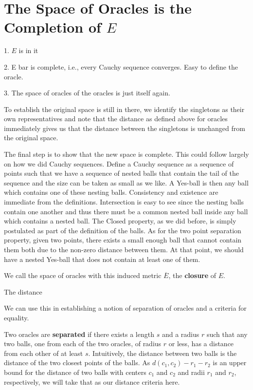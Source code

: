 \documentclass[12pt]{article}
\begin{document}
\section{The Space of Oracles is the Completion of \texorpdfstring{$E$}{E}}

1. $E$ is in it

2. E bar is complete, i.e., every Cauchy sequence converges. Easy to define the oracle.

3. The space of oracles of the oracles is just itself again. 

To establish the original space is still in there, we identify the singletons as their own representatives and note that the distance as defined above for oracles immediately gives us that the distance between the singletons is unchanged from the original space. 

The final step is to show that the new space is complete. This could follow largely on how we did Cauchy sequences. Define a Cauchy sequence as a sequence of points such that we have a sequence of nested balls that contain the tail of the sequence and the size can be taken as small as we like. A Yes-ball is then any ball which contains one of these nesting balls. Consistency and existence are immediate from the definitions. Intersection is easy to see since the nesting balls contain one another and thus there must be a common nested ball inside any ball which contains a nested ball. The Closed property, as we did before, is simply postulated as part of the definition of the balls. As for the two point separation property, given two points, there exists a small enough ball that cannot contain them both due to the non-zero distance between them. At that point, we should have a nested Yes-ball that does not contain at least one of them. 

We call the space of oracles with this induced metric $\overline{E}$, the \textbf{closure} of $E$.






The distance 

We can use this in establishing a notion of separation of oracles and a criteria for equality. 

Two oracles are \textbf{separated} if there exists a length $s$ and a radius $r$ such that any two balls, one from each of the two oracles, of radius $r$ or less, has a distance from each other of at least $s$. Intuitively, the distance between two balls is the distance of the two closest points of the balls. As $d(c_1, c_2) - r_1 - r_2$ is an upper bound for the distance of two balls with centers $c_1$ and $c_2$ and radii $r_1$ and $r_2$, respectively, we will take that as our distance criteria here. 
\end{document}
